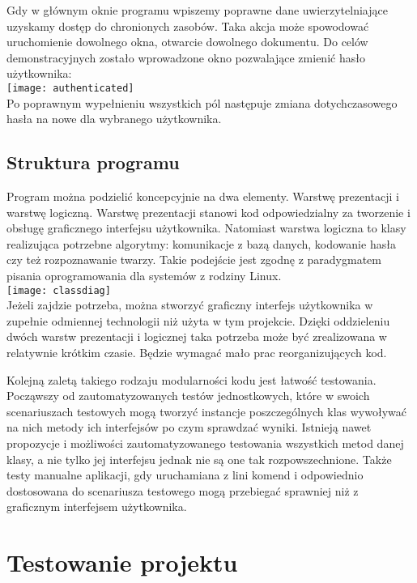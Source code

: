\documentclass[eng,printmode]{mgr}
\begin{document}
Gdy w głównym oknie programu wpiszemy poprawne dane uwierzytelniające uzyskamy dostęp do chronionych zasobów. Taka akcja może spowodować uruchomienie dowolnego okna, otwarcie dowolnego dokumentu. Do celów demonstracyjnych zostało wprowadzone okno pozwalające zmienić hasło użytkownika:\\
\texttt{[image: authenticated]}\\

Po poprawnym wypełnieniu wszystkich pól następuje zmiana dotychczasowego hasła na nowe dla wybranego użytkownika.
\section{Struktura programu}
Program można podzielić koncepcyjnie na dwa elementy. Warstwę prezentacji i warstwę logiczną. Warstwę prezentacji stanowi kod odpowiedzialny za tworzenie i obsługę graficznego interfejsu użytkownika. Natomiast warstwa logiczna to klasy realizująca potrzebne algorytmy: komunikacje z bazą danych, kodowanie hasła czy też rozpoznawanie twarzy. Takie podejście jest zgodnę z paradygmatem pisania oprogramowania dla systemów z rodziny Linux.\\
\texttt{[image: classdiag]}\\
Jeżeli zajdzie potrzeba, można stworzyć graficzny interfejs użytkownika w zupełnie odmiennej technologii niż użyta w tym projekcie. Dzięki oddzieleniu dwóch warstw prezentacji i logicznej taka potrzeba może być zrealizowana w relatywnie krótkim czasie. Będzie wymagać mało prac reorganizujących kod.

Kolejną zaletą takiego rodzaju modularności kodu jest łatwość testowania. Począwszy od zautomatyzowanych testów jednostkowych, które w swoich scenariuszach testowych mogą tworzyć instancje poszczególnych klas wywoływać na nich metody ich interfejsów po czym sprawdzać wyniki. Istnieją nawet propozycje i możliwości zautomatyzowanego testowania wszystkich metod danej klasy, a nie tylko jej interfejsu jednak nie są one tak rozpowszechnione. Także testy manualne aplikacji, gdy uruchamiana z lini komend i odpowiednio dostosowana do scenariusza testowego mogą przebiegać sprawniej niż z graficznym interfejsem użytkownika.

\chapter{Testowanie projektu}
\end{document}
